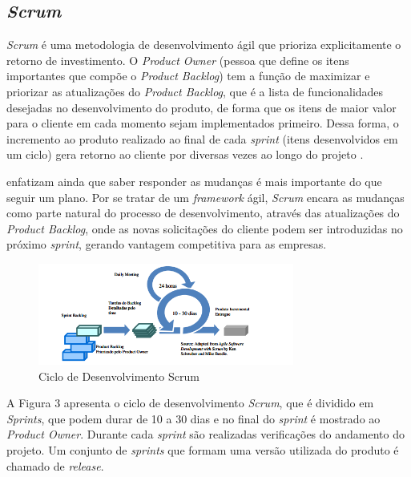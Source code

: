 \documentclass[
	12pt,				%
    oneside,			%
	a4paper,			%
	english,			%
	french,				%
	spanish,			%
	brazil,				%
	]{abntex2}
\begin{document}
\subsection{\textit{Scrum}}
\textit{Scrum} é uma metodologia de desenvolvimento ágil que prioriza explicitamente
o retorno de investimento. O \textit{Product Owner} (pessoa que define os itens importantes
que compõe o \textit{Product Backlog}) tem a função de maximizar e priorizar as atualizações
do \textit{Product Backlog}, que é a lista de funcionalidades desejadas no desenvolvimento
do produto, de forma que os itens de maior valor para o cliente em cada momento
sejam implementados primeiro. Dessa forma, o incremento ao produto realizado ao
final de cada \textit{sprint} (itens desenvolvidos em um ciclo) gera retorno ao cliente por
diversas vezes ao longo do projeto \cite{machado}. 

 enfatizam ainda que saber responder as mudanças é mais
importante do que seguir um plano. Por se tratar de um \textit{framework} ágil, \textit{Scrum} encara 
as mudanças como parte natural do processo de desenvolvimento, através das
atualizações do \textit{Product Backlog}, onde as novas solicitações do cliente podem ser
introduzidas no próximo \textit{sprint}, gerando vantagem competitiva para as empresas.

\begin{figure} [hbt] 
\label{figura1} 
\caption{Ciclo de Desenvolvimento Scrum \cite{vascharim}}
\begin{center}
\includegraphics[width=0.75\textwidth]{scrum.png}
\end{center}
\end{figure}

A Figura 3 apresenta o ciclo de desenvolvimento \textit{Scrum}, que é dividido em
\textit{Sprints}, que podem durar de 10 a 30 dias e no final do \textit{sprint} é mostrado ao \textit{Product
Owner}. Durante cada \textit{sprint} são realizadas verificações do andamento do projeto. Um
conjunto de \textit{sprints} que formam uma versão utilizada do produto é chamado de
\textit{release}.
\end{document}
